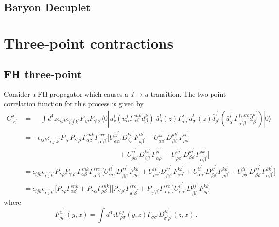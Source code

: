 \documentclass[prd,12pt,superscriptaddress,tightenlines,nofootinbib]{revtex4}
\def\a{{\alpha}}
\def\b{{\beta}}
\def\g{{\gamma}}
\def\G{{\Gamma}}
\def\l{{\lambda}}
\def\s{{\sigma}}
\def\ip{{i^\prime}}
\def\jp{{j^\prime}}
\def\kp{{k^\prime}}
\def\ap{{\alpha^\prime}}
\def\bp{{\beta^\prime}}
\def\gp{{\gamma^\prime}}
\def\rp{{\rho^\prime}}
\def\sp{{\sigma^\prime}}
\begin{document}
	







\subsection*{Baryon Decuplet}


\section{Three-point contractions}

\subsection{FH three-point}
\bigskip
Consider a FH propagator which causes a $d\rightarrow u$ transition.
The two-point correlation function for this process is given by
\begin{align}
C^\l_{\g\gp} &= \phantom{-}\int d^4 z \epsilon_{ijk} \epsilon_{\ip\jp\kp} P_{\g\rho} P_{\gp\rp} 
	\langle 0| 
		u^i_\rho (u^j_\a \G^{snk}_{\a\b} d^k_\b ) \ 
		\bar{u}^l_\s(z) \G^\l_{\s\sp} d^l_{\sp}(z)
		\bar{d}^\ip_\rp (\bar{u}^{\jp}_{\ap} \G^{\dagger,src}_{\ap\bp} \bar{d}^\kp_\bp ) 
	|0\rangle
\nonumber\\&=
	-\epsilon_{ijk} \epsilon_{\ip\jp\kp} P_{\g\rho} P_{\gp\rp} 
	\G^{snk}_{\a\b} \G^{src}_{\ap\bp} 
	\Big[
		U^{j\jp}_{\a\ap} D^{k\ip}_{\b\rp} F^{i\kp}_{\rho\bp}
		-U^{j\jp}_{\a\ap} D^{k\kp}_{\b\bp} F^{i\ip}_{\rho\rp}
\nonumber\\&\qquad\qquad\qquad\qquad\qquad\qquad\qquad
		+U^{i\jp}_{\rho\ap} D^{k\kp}_{\b\bp} F^{j\ip}_{\a\rp}
		-U^{i\jp}_{\rho\ap} D^{k\ip}_{\b\rp} F^{j\kp}_{\a\bp}
	\Big]
\nonumber\\&=
	\epsilon_{ijk} \epsilon_{\ip\jp\kp} P_{\g\rho} P_{\gp\rp} 
	\G^{snk}_{\a\b} \G^{src}_{\ap\bp} 
	\Big[
		U^{i\ip}_{\a\ap} D^{j\jp}_{\b\bp} F^{k\kp}_{\rho\rp}
		+U^{i\ip}_{\rho\ap} D^{j\jp}_{\b\bp} F^{k\kp}_{\a\rp}
		+U^{i\ip}_{\a\ap} D^{j\jp}_{\b\rp} F^{k\kp}_{\rho\bp}
		+U^{i\ip}_{\rho\ap} D^{j\jp}_{\b\rp} F^{k\kp}_{\a\bp}
	\Big]
\nonumber\\&=
	\epsilon_{ijk} \epsilon_{\ip\jp\kp}  
	\Big[ 
		P_{\g\rho} \G^{snk}_{\a\b} 
		+P_{\g\a} \G^{snk}_{\rho\b}
	\Big] \Big[
		P_{\gp\rp} \G^{src}_{\ap\bp} + P_{\gp\bp} \G^{src}_{\ap\rp}
	\Big]
	U^{i\ip}_{\a\ap} D^{j\jp}_{\b\bp} F^{k\kp}_{\rho\rp}
\end{align}
where
\begin{equation}
F^{i\ip}_{\rho\rp}(y,x) = \int d^4z U^{ij}_{\rho\s}(y,z)\G_{\s\sp} D^{j\ip}_{\sp\rp}(z,x)\, .
\end{equation}
\end{document}
